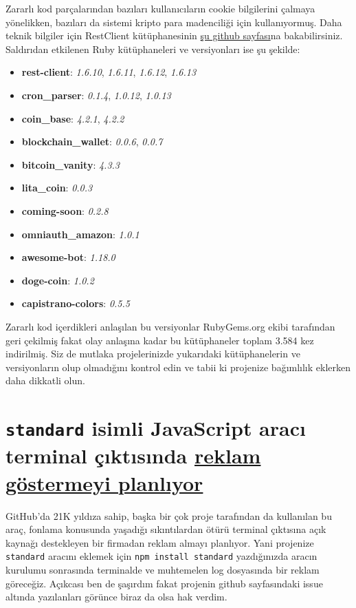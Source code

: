 \documentclass[11pt]{article}
\begin{document}
Zararlı kod parçalarından bazıları kullanıcıların cookie bilgilerini çalmaya
yönelikken, bazıları da sistemi kripto para madenciliği için kullanıyormuş.
Daha teknik bilgiler için RestClient kütüphanesinin \href{https://github.com/rest-client/rest-client/issues/713}{şu github sayfası}na
bakabilirsiniz. Saldırıdan etkilenen Ruby kütüphaneleri ve versiyonları ise şu
şekilde:

\begin{itemize}
\item \textbf{rest-client}: \emph{1.6.10}, \emph{1.6.11}, \emph{1.6.12}, \emph{1.6.13}
\item \textbf{cron\_parser}: \emph{0.1.4}, \emph{1.0.12}, \emph{1.0.13}
\item \textbf{coin\_base}: \emph{4.2.1}, \emph{4.2.2}
\item \textbf{blockchain\_wallet}: \emph{0.0.6}, \emph{0.0.7}
\item \textbf{bitcoin\_vanity}: \emph{4.3.3}
\item \textbf{lita\_coin}: \emph{0.0.3}
\item \textbf{coming-soon}: \emph{0.2.8}
\item \textbf{omniauth\_amazon}: \emph{1.0.1}
\item \textbf{awesome-bot}: \emph{1.18.0}
\item \textbf{doge-coin}: \emph{1.0.2}
\item \textbf{capistrano-colors}: \emph{0.5.5}
\end{itemize}

Zararlı kod içerdikleri anlaşılan bu versiyonlar RubyGems.org ekibi tarafından
geri çekilmiş fakat olay anlaşına kadar bu kütüphaneler toplam 3.584 kez
indirilmiş. Siz de mutlaka projelerinizde yukarıdaki kütüphanelerin ve
versiyonların olup olmadığını kontrol edin ve tabii ki projenize bağımlılık
eklerken daha dikkatli olun.

\section{\texttt{standard} isimli JavaScript aracı terminal çıktısında \href{https://github.com/standard/standard/issues/1381}{reklam göstermeyi planlıyor}}
\label{sec:org14364d6}
GitHub'da 21K yıldıza sahip, başka bir çok proje tarafından da kullanılan bu
araç, fonlama konusunda yaşadığı sıkıntılardan ötürü terminal çıktısına açık
kaynağı destekleyen bir firmadan reklam almayı planlıyor. Yani projenize
\texttt{standard} aracını eklemek için \texttt{npm install standard} yazdığınızda aracın
kurulumu sonrasında terminalde ve muhtemelen log dosyasında bir reklam
göreceğiz. Açıkcası ben de şaşırdım fakat projenin github sayfasındaki issue
altında yazılanları görünce biraz da olsa hak verdim.
\end{document}
